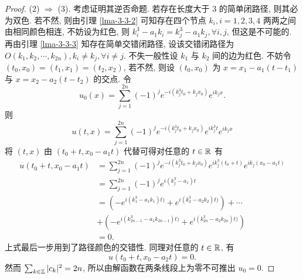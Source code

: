 \begin{proof}
(2) $\Rightarrow$ (3). 考虑证明其逆否命题. 若存在长度大于 $3$ 的简单闭路径, 则其必为双色. 若不然, 则由引理 \ref{lma-3-3-2} 可知存在四个节点 $k_i,i=1,2,3,4$ 两两之间由相同颜色相连, 不妨设为红色, 则 $k_i^3-a_1 k_i=k_j^3-a_1k_j,\forall i,j$, 但这是不可能的. 再由引理 \ref{lma-3-3-3} 知存在简单交错闭路径, 设该交错闭路径为 $O(k_1,k_2,\cdots,k_{2n}), k_i\neq k_j, \forall i\neq j$. 不失一般性设 $k_1$ 与 $k_2$ 间的边为红色. 不妨令 $(t_0,x_0)=(t_1,x_1)=(t_2,x_2)$, 若不然, 则设 $(t_0,x_0)$ 为 $x=x_1-a_1(t-t_1)$ 与 $x=x_2-a_2(t-t_2)$ 的交点. 令 
\begin{equation*}
    u_0(x)=\sum_{j=1}^{2n}(-1)^je^{-i(k_j^3t_0+k_jx_0)}e^{ik_jx}.
\end{equation*}
则
\begin{equation*}
    u(t,x)=\sum_{j=1}^{2n}(-1)^j e^{-i(k_j^3t_0+k_jx_0)}e^{ik_j^3 t}e^{ik_jx} 
\end{equation*}
将 $(t,x)$ 由 $(t_0+t,x_0-a_1t)$ 代替可得对任意的 $t\in \mathbb{R}$ 有
\begin{align*}
    u(t_0+t,x_0-a_1t)&=\sum_{j=1}^{2n}(-1)^j e^{-i(k_j^3t_0+k_jx_0)}e^{ik_j^3 (t_0+t)}e^{ik_j(x_0-a_1t)} \\
    &=\sum_{j=1}^{2n}(-1)^j e^{i(k_j^3-a_1)t}\\
    &=\left(-e^{i(k_1^3-a_1 k_1)t)}+e^{i(k_2^3-a_2k_2)t)}\right)+\cdots\\
    &+\left(-e^{i(k_{2n-1}^3-a_1k_{2n-1})t)}+e^{i(k_{2n}^3-a_2k_{2n})t)}\right)\\
    &=0.
\end{align*}
上式最后一步用到了路径颜色的交错性.
同理对任意的 $t\in \mathbb{R}$, 有 
\begin{equation*}
    u(t_0+t,x_0-a_2t)=0.
\end{equation*}
然而 $\sum_{k\in \mathbb{Z}} |c_k|^2=2n$, 所以由解函数在两条线段上为零不可推出 $u_0=0$.


\end{proof}
